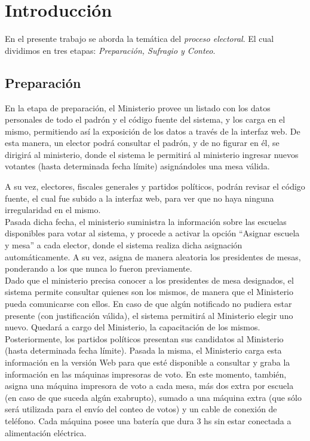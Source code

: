 \section{Introducci\'on}

En el presente trabajo se aborda la tem\'atica del \emph{proceso electoral}. El cual dividimos en tres etapas: \textit{Preparaci\'on, Sufragio y Conteo}.\\


\subsection{Preparación}

En la etapa de preparación, el Ministerio provee un listado con los datos personales de todo el padrón y el c\'odigo fuente del sistema, y los carga en el mismo, permitiendo así la exposición de los datos a través de la interfaz web. De esta manera, un elector podrá consultar el padrón, y de no figurar en él, se dirigirá al ministerio, donde el sistema le permitirá al ministerio ingresar nuevos votantes  (hasta determinada fecha límite) asignándoles una mesa válida. 

A su vez, electores, fiscales generales y partidos políticos, podrán revisar el código fuente, el cual fue subido a la interfaz web, para ver que no haya ninguna irregularidad en el mismo.\\

Pasada dicha fecha, el ministerio suministra la información sobre las escuelas disponibles para votar al sistema, y procede a activar la opción “Asignar escuela y mesa” a cada elector, donde el sistema realiza dicha asignación automáticamente. A su vez, asigna de manera aleatoria los presidentes de mesas, ponderando a los que nunca lo fueron previamente.\\

Dado que el ministerio precisa conocer a los presidentes de mesa designados, el sistema permite consultar quienes son los mismos, de manera que el Ministerio pueda comunicarse con ellos. En caso de que algún notificado no pudiera estar presente (con justificación válida), el sistema permitirá al Ministerio elegir uno nuevo. Quedará a cargo del Ministerio, la capacitación de los mismos.\\

Posteriormente, los partidos políticos presentan sus candidatos al Ministerio (hasta determinada fecha límite). Pasada la misma, el Ministerio carga esta información en la versión Web para que esté disponible a consultar y graba la información en las máquinas impresoras de voto. En este momento, también, asigna una máquina impresora de voto a cada mesa, más dos extra por escuela (en caso de que suceda algún exabrupto), sumado a una máquina extra (que sólo será utilizada para el envío del conteo de votos) y un cable de conexión de teléfono. Cada máquina posee una batería que dura 3 hs sin estar conectada a alimentación eléctrica. 

